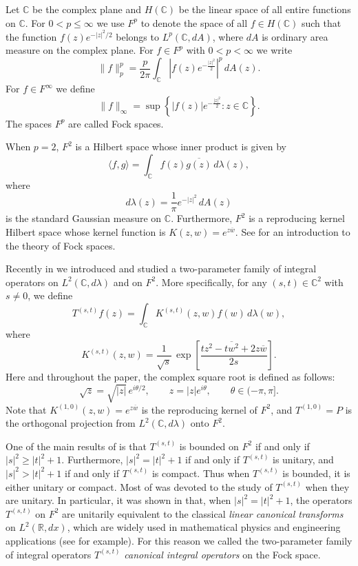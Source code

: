 \documentclass[reqno]{amsart}
\newcommand{\R}{{\mathbb R}}
\newcommand{\C}{{\mathbb C}}
\newcommand{\inc}{\int_{\C}}
\begin{document}
Let $\C$ be the complex plane and $H(\C)$ be the linear space of all entire
functions on $\C$. For $0<p\leq\infty$ we use $F^p$ to denote the space of all
$f\in H(\C)$ such that the function $f(z)e^{-|z|^2/2}$ belongs to
$L^p(\C, dA)$, where $dA$ is ordinary area measure on the complex
plane. For $f\in F^p$ with $0<p< \infty$ we write
$$\|f\|_p^p=\frac{p}{2\pi}\inc \left|f(z)e^{-\frac{|z|^2}{2}}\right|^p\,dA(z).$$
For $f\in F^\infty$ we define
$$\|f\|_\infty=\sup\left\{|f(z)|e^{-\frac{|z|^2}{2}}: z\in\C\right\}.$$
The spaces $F^p$ are called Fock spaces.

When $p=2$, $F^2$ is a Hilbert space whose inner product is given by
$$\langle f,g\rangle=\inc f(z)\overline{g(z)}\,d\lambda(z),$$
where
$$d\lambda(z)=\frac1\pi e^{-{|z|^2}}\,dA(z)$$
is the standard Gaussian measure on $\C$. Furthermore, $F^2$ is a reproducing
kernel Hilbert space whose kernel function is $K(z,w)=e^{z\overline w}$.
See \cite{Zhu1} for an introduction to the theory of Fock spaces.

Recently in \cite{DZ3} we introduced and studied a two-parameter family of
integral operators on $L^2(\C, d\lambda)$ and on $F^2$. More specifically,
for any $(s,t)\in\C^2$ with $s\not=0$, we define
\begin{equation}\label{operator_def}
T^{(s,t)}f(z)=\inc K^{(s,t)}(z,w)f(w)\,d\lambda(w),
\end{equation}
where
$$K^{(s,t)}(z,w)=\frac1{\sqrt s}\,\exp\left[\frac{tz^2-\overline{tw^2}
+2z\overline w}{2s}\right].$$
Here and throughout the paper, the complex square root is defined as follows:
$$\sqrt z=\sqrt{|z|}\,e^{i\theta/2},\qquad z=|z|e^{i\theta},
\qquad \theta\in(-\pi, \pi].$$
Note that $K^{(1,0)}(z,w)=e^{z\overline{w}}$ is the reproducing kernel
of $F^2$, and $T^{(1,0)}=P$ is the orthogonal projection from
$L^2(\C, d\lambda)$ onto $F^2$.

One of the main results of \cite{DZ3} is that $T^{(s,t)}$ is bounded on $F^2$
if and only if $|s|^2\ge|t|^2+1$. Furthermore, $|s|^2=|t|^2+1$ if and only
if $T^{(s,t)}$ is unitary, and $|s|^2>|t|^2+1$ if and only if $T^{(s,t)}$ is
compact. Thus when $T^{(s,t)}$ is bounded, it is either unitary or compact.
Most of \cite{DZ3} was devoted to the study of $T^{(s,t)}$ when
they are unitary. In particular, it was shown in \cite{DZ3} that,  when 
$|s|^2=|t|^2+1$, the operators $T^{(s,t)}$ on $F^2$ are unitarily 
equivalent to the classical {\it linear canonical 
transforms} on $L^2(\R, dx)$, which are widely used in mathematical 
physics and engineering applications (see \cite{HKOS} for example). 
For this reason we called the two-parameter family of integral operators 
$T^{(s,t)}$ {\it canonical integral operators} on the Fock space.
\end{document}
